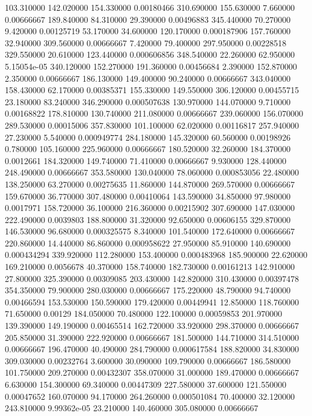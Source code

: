 103.310000	142.020000	154.330000	0.00180466
310.690000	155.630000	7.660000	0.00666667
189.840000	84.310000	29.390000	0.00496883
345.440000	70.270000	9.420000	0.00125719
53.170000	34.600000	120.170000	0.000187906
157.760000	32.940000	309.560000	0.00666667
7.420000	79.400000	297.950000	0.00228518
329.550000	20.610000	123.440000	0.000606856
348.540000	22.260000	62.950000	5.15054e-05
340.120000	152.270000	191.360000	0.00456684
2.390000	152.870000	2.350000	0.00666667
186.130000	149.400000	90.240000	0.00666667
343.040000	158.430000	62.170000	0.00385371
155.330000	149.550000	306.120000	0.00455715
23.180000	83.240000	346.290000	0.000507638
130.970000	144.070000	9.710000	0.00168822
178.810000	130.740000	211.080000	0.00666667
239.060000	156.070000	289.530000	0.00015006
357.830000	101.100000	62.020000	0.00116817
257.940000	27.230000	5.540000	0.000949774
284.180000	145.320000	60.560000	0.00198926
0.780000	105.160000	225.960000	0.00666667
180.520000	32.260000	184.370000	0.0012661
184.320000	149.740000	71.410000	0.00666667
9.930000	128.440000	248.490000	0.00666667
353.580000	130.040000	78.060000	0.000853056
22.480000	138.250000	63.270000	0.00275635
11.860000	144.870000	269.570000	0.00666667
159.670000	36.770000	307.480000	0.00410064
143.590000	34.850000	97.980000	0.0017971
158.720000	36.100000	216.360000	0.00215902
307.690000	147.030000	222.490000	0.0039803
188.800000	31.320000	92.650000	0.00606155
329.870000	146.530000	96.680000	0.000325575
8.340000	101.540000	172.640000	0.00666667
220.860000	14.440000	86.860000	0.000958622
27.950000	85.910000	140.690000	0.000434294
339.920000	112.280000	153.400000	0.000483968
185.900000	22.620000	169.210000	0.0056678
40.370000	158.740000	182.730000	0.00161213
142.910000	27.800000	325.390000	0.00309085
203.430000	142.820000	310.430000	0.00397478
354.350000	79.900000	280.030000	0.00666667
175.220000	48.790000	94.740000	0.00466594
153.530000	150.590000	179.420000	0.00449941
12.850000	118.760000	71.650000	0.00129
184.050000	70.480000	122.100000	0.00059853
201.970000	139.390000	149.190000	0.00465514
162.720000	33.920000	298.370000	0.00666667
205.850000	31.390000	222.920000	0.00666667
181.500000	144.710000	314.510000	0.00666667
196.470000	40.490000	284.790000	0.000617584
188.820000	34.830000	309.030000	0.00232764
3.600000	30.090000	109.790000	0.00666667
186.580000	101.750000	209.270000	0.00432307
358.070000	31.000000	189.470000	0.00666667
6.630000	154.300000	69.340000	0.00447309
227.580000	37.600000	121.550000	0.00047652
160.070000	94.170000	264.260000	0.000501084
70.400000	32.120000	243.810000	9.99362e-05
23.210000	140.460000	305.080000	0.00666667
